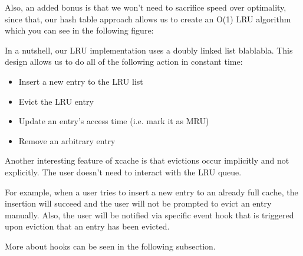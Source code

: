 Also, an added bonus is that we won't need to sacrifice speed over optimality, 
since that, our hash table approach allows us to create an O(1) LRU algorithm 
which you can see in the following figure:


In a nutshell, our LRU implementation uses a doubly linked list blablabla.
This design allows us to do all of the following action in constant time:

\begin{itemize}
	\item Insert a new entry to the LRU list
	\item Evict the LRU entry
	\item Update an entry's access time (i.e. mark it as MRU)
	\item Remove an arbitrary entry
\end{itemize}

Another interesting feature of xcache is that evictions occur implicitly and not 
explicitly. The user doesn't need to interact with the LRU queue.

For example, when a user tries to insert a new entry to an already full cache, 
the insertion will succeed and the user will not be prompted to evict an entry 
manually. Also, the user will be notified via specific event hook that is 
triggered upon eviction that an entry has been evicted.

More about hooks can be seen in the following subsection.

\begin{comment}
\subsection{Hooks}


The hooks that xcache provides to users are:

\begin{itemize}
	\item on\_ init: called on cache entry initialization.
	\item on\_put: called when the last reference to the cache entry is put
	\item on\_evict: called when a cache entry is evicted.
	\item on\_node\_init: called on initial node preparation.
	\item post\_evict: called after an eviction has occurred, with cache  
		lock held.
	\item on\_free: called when a cache entry is freed.
	\item on\_finalize: called to hint the user that the cache entry's ref 
		has dropped to zero.
	\item on\_reinsert: called when a cache entry has been in cache
\end{itemize}

\end{comment}

